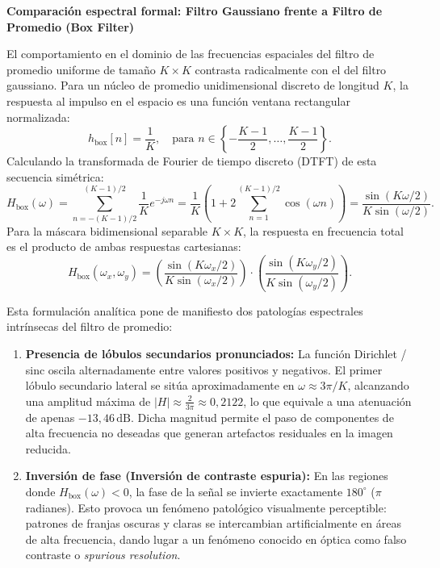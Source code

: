 \documentclass[11pt]{article}
\begin{document}
\textbf{Comparación espectral formal: Filtro Gaussiano frente a Filtro de Promedio (Box Filter)}

El comportamiento en el dominio de las frecuencias espaciales del filtro de promedio uniforme de tamaño $K \times K$ contrasta radicalmente con el del filtro gaussiano. Para un núcleo de promedio unidimensional discreto de longitud $K$, la respuesta al impulso en el espacio es una función ventana rectangular normalizada:
\begin{equation}
h_{\text{box}}[n] = \frac{1}{K}, \quad \text{para } n \in \left\{ -\frac{K-1}{2}, \ldots, \frac{K-1}{2} \right\}.
\end{equation}
Calculando la transformada de Fourier de tiempo discreto (DTFT) de esta secuencia simétrica:
\begin{equation}
H_{\text{box}}(\omega) = \sum_{n=-(K-1)/2}^{(K-1)/2} \frac{1}{K} e^{-j\omega n} = \frac{1}{K} \left( 1 + 2 \sum_{n=1}^{(K-1)/2} \cos(\omega n) \right) = \frac{\sin(K\omega / 2)}{K \sin(\omega / 2)}.
\end{equation}
Para la máscara bidimensional separable $K \times K$, la respuesta en frecuencia total es el producto de ambas respuestas cartesianas:
\begin{equation}
H_{\text{box}}(\omega_x, \omega_y) = \left( \frac{\sin(K\omega_x / 2)}{K \sin(\omega_x / 2)} \right) \cdot \left( \frac{\sin(K\omega_y / 2)}{K \sin(\omega_y / 2)} \right).
\end{equation}

Esta formulación analítica pone de manifiesto dos patologías espectrales intrínsecas del filtro de promedio:
\begin{enumerate}[itemsep=0.25em]
\item \textbf{Presencia de lóbulos secundarios pronunciados:} La función Dirichlet / sinc oscila alternadamente entre valores positivos y negativos. El primer lóbulo secundario lateral se sitúa aproximadamente en $\omega \approx 3\pi/K$, alcanzando una amplitud máxima de $|H| \approx \frac{2}{3\pi} \approx 0,2122$, lo que equivale a una atenuación de apenas $-13,46\,\text{dB}$. Dicha magnitud permite el paso de componentes de alta frecuencia no deseadas que generan artefactos residuales en la imagen reducida.
\item \textbf{Inversión de fase (Inversión de contraste espuria):} En las regiones donde $H_{\text{box}}(\omega) < 0$, la fase de la señal se invierte exactamente $180^\circ$ ($\pi$ radianes). Esto provoca un fenómeno patológico visualmente perceptible: patrones de franjas oscuras y claras se intercambian artificialmente en áreas de alta frecuencia, dando lugar a un fenómeno conocido en óptica como falso contraste o \textit{spurious resolution}.
\end{enumerate}
\end{document}

